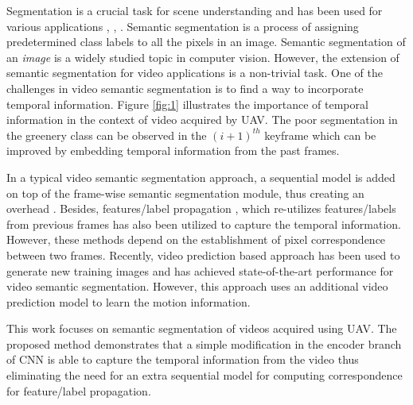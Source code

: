 \documentclass[journal]{IEEEtran}
\begin{document}
\par Segmentation is a crucial task for scene understanding and has been used for various applications \cite{18}, \cite{2}, \cite{Ujjwal-Seg1}. Semantic segmentation is a process of assigning predetermined class labels to all the pixels in an image. Semantic segmentation of an \textit{image} is a widely studied topic in computer vision. However, the extension of semantic segmentation for video applications is a non-trivial task. One of the challenges in video semantic segmentation is to find a way to incorporate temporal information. Figure \ref{fig:1} illustrates the importance of temporal information in the context of video acquired by UAV. The poor segmentation in the greenery class can be observed in the $(i+1)^{th}$ keyframe which can be improved by embedding temporal information from the past frames. 

\par In a typical video semantic segmentation approach, a sequential model is added on top of the frame-wise semantic segmentation module, thus creating an overhead \cite{13}. Besides, features/label propagation \cite{7}, which re-utilizes features/labels from previous frames has also been utilized to capture the temporal information. However, these methods depend on the establishment of pixel correspondence between two frames. Recently, video prediction based approach \cite{22} has been used to generate new training images and has achieved state-of-the-art performance for video semantic segmentation. However, this approach uses an additional video prediction model to learn the motion information. 

\par This work focuses on semantic segmentation of videos acquired using UAV. The proposed method demonstrates that a simple modification in the encoder branch of CNN is able to capture the temporal information from the video thus eliminating the need for an extra sequential model for computing correspondence for feature/label propagation. 
\end{document}
